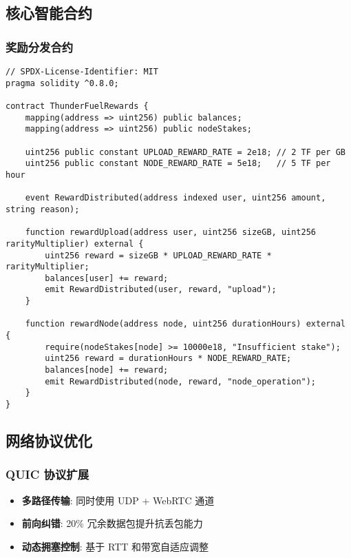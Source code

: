 \documentclass[12pt,a4paper]{article}
\begin{document}
\subsection{核心智能合约}

\subsubsection{奖励分发合约}

\begin{lstlisting}[language=Solidity, frame=single, basicstyle=\footnotesize]
// SPDX-License-Identifier: MIT
pragma solidity ^0.8.0;

contract ThunderFuelRewards {
    mapping(address => uint256) public balances;
    mapping(address => uint256) public nodeStakes;
    
    uint256 public constant UPLOAD_REWARD_RATE = 2e18; // 2 TF per GB
    uint256 public constant NODE_REWARD_RATE = 5e18;   // 5 TF per hour
    
    event RewardDistributed(address indexed user, uint256 amount, string reason);
    
    function rewardUpload(address user, uint256 sizeGB, uint256 rarityMultiplier) external {
        uint256 reward = sizeGB * UPLOAD_REWARD_RATE * rarityMultiplier;
        balances[user] += reward;
        emit RewardDistributed(user, reward, "upload");
    }
    
    function rewardNode(address node, uint256 durationHours) external {
        require(nodeStakes[node] >= 10000e18, "Insufficient stake");
        uint256 reward = durationHours * NODE_REWARD_RATE;
        balances[node] += reward;
        emit RewardDistributed(node, reward, "node_operation");
    }
}
\end{lstlisting}

\subsection{网络协议优化}

\subsubsection{QUIC 协议扩展}
\begin{itemize}
    \item \textbf{多路径传输}: 同时使用 UDP + WebRTC 通道
    \item \textbf{前向纠错}: 20\% 冗余数据包提升抗丢包能力
    \item \textbf{动态拥塞控制}: 基于 RTT 和带宽自适应调整
\end{itemize}
\end{document}
